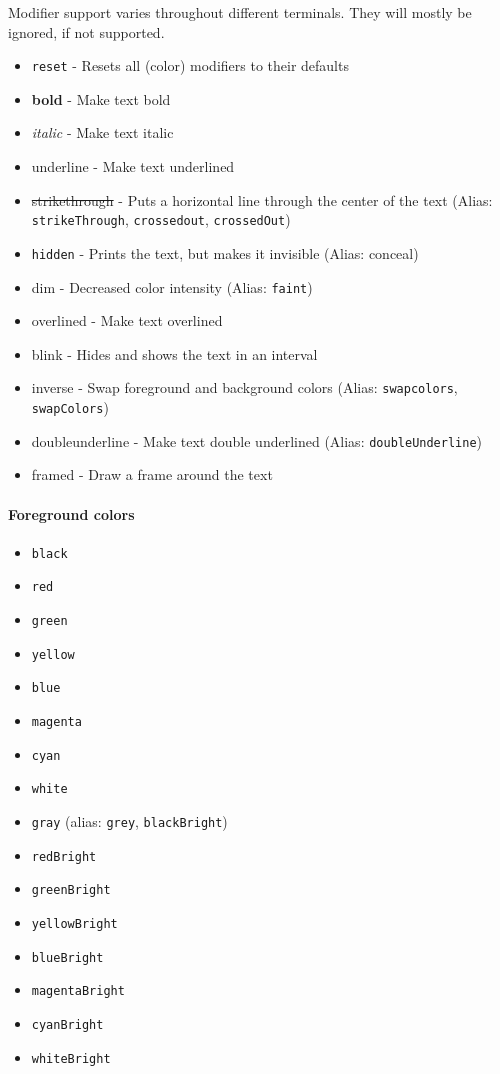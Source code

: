 Modifier support varies throughout different terminals. They will mostly
be ignored, if not supported.

\begin{itemize}
\tightlist
\item
  \texttt{reset} - Resets all (color) modifiers to their defaults
\item
  \textbf{bold} - Make text bold
\item
  \emph{italic} - Make text italic
\item
  {underline} - Make text underlined
\item
  \st{strikethrough} - Puts a horizontal line through the center of the
  text (Alias: \texttt{strikeThrough}, \texttt{crossedout},
  \texttt{crossedOut})
\item
  \texttt{hidden} - Prints the text, but makes it invisible (Alias:
  conceal)
\item
  {dim} - Decreased color intensity (Alias: \texttt{faint})
\item
  {overlined} - Make text overlined
\item
  blink - Hides and shows the text in an interval
\item
  {inverse} - Swap foreground and background colors (Alias:
  \texttt{swapcolors}, \texttt{swapColors})
\item
  {doubleunderline} - Make text double underlined (Alias:
  \texttt{doubleUnderline})
\item
  {framed} - Draw a frame around the text
\end{itemize}

\paragraph{Foreground colors}\label{foreground-colors}

\begin{itemize}
\tightlist
\item
  \texttt{black}
\item
  \texttt{red}
\item
  \texttt{green}
\item
  \texttt{yellow}
\item
  \texttt{blue}
\item
  \texttt{magenta}
\item
  \texttt{cyan}
\item
  \texttt{white}
\item
  \texttt{gray} (alias: \texttt{grey}, \texttt{blackBright})
\item
  \texttt{redBright}
\item
  \texttt{greenBright}
\item
  \texttt{yellowBright}
\item
  \texttt{blueBright}
\item
  \texttt{magentaBright}
\item
  \texttt{cyanBright}
\item
  \texttt{whiteBright}
\end{itemize}

